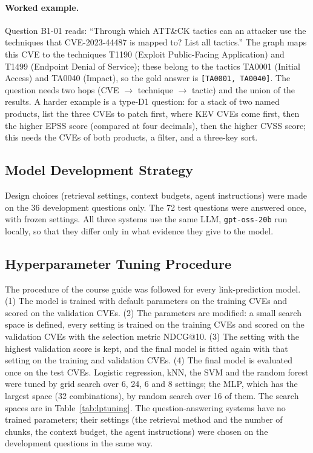 \documentclass[12pt, a4paper]{article}
\begin{document}
\paragraph{Worked example.} Question B1-01 reads: ``Through which ATT\&CK tactics can an attacker use the techniques that CVE-2023-44487 is mapped to? List all tactics.'' The graph maps this CVE to the techniques T1190 (Exploit Public-Facing Application) and T1499 (Endpoint Denial of Service); these belong to the tactics TA0001 (Initial Access) and TA0040 (Impact), so the gold answer is \texttt{[TA0001, TA0040]}. The question needs two hops (CVE $\rightarrow$ technique $\rightarrow$ tactic) and the union of the results. A harder example is a type-D1 question: for a stack of two named products, list the three CVEs to patch first, where KEV CVEs come first, then the higher EPSS score (compared at four decimals), then the higher CVSS score; this needs the CVEs of both products, a filter, and a three-key sort.
\subsection{Model Development Strategy}
Design choices (retrieval settings, context budgets, agent instructions) were made on the 36 development questions only. The 72 test questions were answered once, with frozen settings. All three systems use the same LLM, \texttt{gpt-oss-20b} run locally, so that they differ only in what evidence they give to the model.
\subsection{Hyperparameter Tuning Procedure}
The procedure of the course guide was followed for every link-prediction model. (1) The model is trained with default parameters on the training CVEs and scored on the validation CVEs. (2) The parameters are modified: a small search space is defined, every setting is trained on the training CVEs and scored on the validation CVEs with the selection metric NDCG@10. (3) The setting with the highest validation score is kept, and the final model is fitted again with that setting on the training and validation CVEs. (4) The final model is evaluated once on the test CVEs. Logistic regression, kNN, the SVM and the random forest were tuned by grid search over 6, 24, 6 and 8 settings; the MLP, which has the largest space (32 combinations), by random search over 16 of them. The search spaces are in Table~\ref{tab:lptuning}. The question-answering systems have no trained parameters; their settings (the retrieval method and the number of chunks, the context budget, the agent instructions) were chosen on the development questions in the same way.
\end{document}
